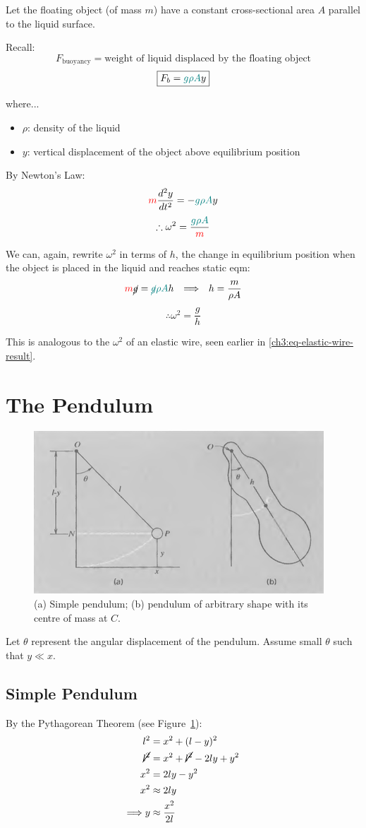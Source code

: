 Let the floating object (of mass $m$) have a constant cross-sectional area $A$ parallel to the liquid surface.

Recall:
\[ F_\text{buoyancy} = \text{weight of liquid displaced by the floating object} \]
\[ \boxed{F_b  = \textcolor{teal}{g\rho A}y} \]

where...
\begin{itemize}
	\item $\rho$: density of the liquid
	\item $y$: vertical displacement of the object above equilibrium position
\end{itemize}


By Newton's Law:
\[ \textcolor{red}{m}\frac{d^2y}{dt^2} = -\textcolor{teal}{g\rho A}y \]
\[ \therefore \omega^2 = \frac{\textcolor{teal}{g\rho A}}{\textcolor{red}{m}} \]

We can, again, rewrite $\omega^2$ in terms of $h$, the change in equilibrium position when the object is placed in the liquid and reaches static eqm:
\[ \textcolor{red}{m}\cancel{g}=\textcolor{teal}{\cancel{g}\rho A} h
\hspace{0.25cm}\Longrightarrow\hspace{0.25cm}
h = \frac{m}{\rho A} \]
\[ \therefore \omega^2 = \frac{g}{h} \]


This is analogous to the $\omega^2$ of an elastic wire, seen earlier in \eqref{ch3:eq-elastic-wire-result}. 


\section{The Pendulum}
\begin{figure}
	\centering
	\includegraphics[scale=0.6]{phys232/Ch3-pendulum.png} \caption{(a) Simple pendulum; (b) pendulum of arbitrary shape with its centre of mass at $C$.}\label{ch3:fig-pendulum}
\end{figure}

Let $\theta$ represent the angular displacement of the pendulum. Assume small $\theta$ such that $y \ll x$. 


\subsection{Simple Pendulum} \label{ch3:sec-simple-pendulum}
By the Pythagorean Theorem (see Figure~\ref{ch3:fig-pendulum}):
\begin{align}
l^2 &= x^2 + (l-y)^2  \notag \\	
\cancel{l^2} &= x^2 + \cancel{l^2} - 2ly + y^2 \notag \\
x^2 &= 2ly - {y^2} \notag \\
x^2 &\approx 2ly  \notag \\
\Longrightarrow y &\approx \frac{x^2}{2l} \label{ch3:eq-pendulum-pythag}
\end{align}

